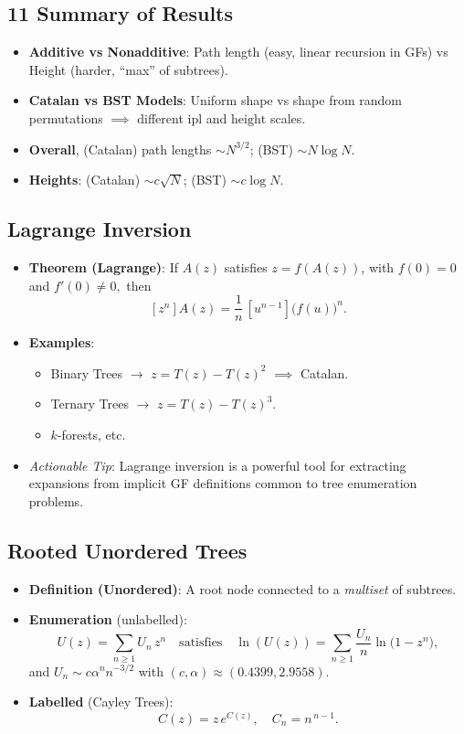 \documentclass[11pt,letterpaper]{article}
\begin{document}
\subsection{11 Summary of Results}
\begin{itemize}
  \item \textbf{Additive vs Nonadditive}: Path length (easy, linear recursion in GFs) vs Height (harder, “max” of subtrees).
  \item \textbf{Catalan vs BST Models}: Uniform shape vs shape from random permutations $\implies$ different $\mathrm{ipl}$ and $\mathrm{height}$ scales.
  \item \textbf{Overall}, (Catalan) path lengths $\sim N^{3/2}$; (BST) $\sim N\log N$. 
  \item \textbf{Heights}: (Catalan) $\sim c\sqrt{N}$; (BST) $\sim c\log N$.
\end{itemize}

\subsection{Lagrange Inversion}
\begin{itemize}
  \item \textbf{Theorem (Lagrange)}: If $A(z)$ satisfies $z=f(A(z))$, with $f(0)=0$ and $f'(0)\neq 0,$ then
    \[
      [z^n]A(z) = \frac{1}{n}\,[u^{n-1}]\bigl(f(u)\bigr)^n.
    \]
  \item \textbf{Examples}:
    \begin{itemize}
      \item Binary Trees $\to$ $z=T(z)-T(z)^2$ $\implies$ Catalan.
      \item Ternary Trees $\to$ $z=T(z)-T(z)^3$.
      \item $k$-forests, etc.
    \end{itemize}
  \item \emph{Actionable Tip}: Lagrange inversion is a powerful tool for extracting expansions from implicit GF definitions common to tree enumeration problems.
\end{itemize}

\subsection{Rooted Unordered Trees}
\begin{itemize}
  \item \textbf{Definition (Unordered)}: A root node connected to a \textit{multiset} of subtrees.
  \item \textbf{Enumeration} (unlabelled):
    \[
      U(z)=\sum_{n\ge1}U_n\,z^n 
      \quad\text{satisfies}\quad
      \ln(U(z))=\sum_{n\ge1}\frac{U_n}{n}\ln\bigl(1-z^n\bigr),
    \]
    and $U_n\sim c\alpha^n n^{-3/2}$ with $(c,\alpha)\approx (0.4399,2.9558).$
  \item \textbf{Labelled} (Cayley Trees):
    \[
      C(z)=z\,e^{C(z)},\quad
      C_n=n^{\,n-1}.
    \]
\end{itemize}
\end{document}
